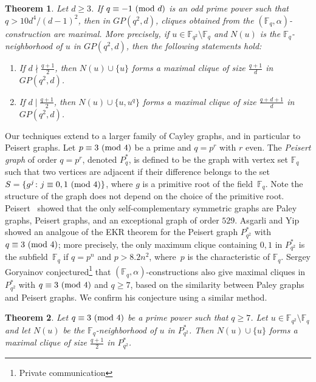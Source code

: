 \documentclass[12pt,reqno]{amsart}
\newtheorem{thm}{Theorem}[section]
\theoremstyle{definition}
\newcommand{\F}{\mathbb{F}}
\renewcommand{\pmod}[1]{{\ifmmode\text{\rm\ (mod~$#1$)}\else\discretionary{}{}{\hbox{ }}\rm(mod~$#1$)\fi}}
\begin{document}
\begin{thm}\label{thm:GP}
Let $d \geq 3$. If $q \equiv -1 \pmod d$ is an odd prime power such that  $q>10d^4/(d-1)^2$, then in $GP(q^2,d)$, cliques obtained from the $(\F_q, \alpha)$-construction are maximal. More precisely, if $u \in \F_{q^2}\setminus \F_q$ and $N(u)$ is the $\F_q$-neighborhood of $u$ in $GP(q^2,d)$, then the following statements hold: 
\begin{enumerate}
    \item[(a)] If $d \nmid \frac{q+1}{2}$, then $N(u) \cup \{u\}$ forms a maximal clique of size $\frac{q+1}{d}$ in $GP(q^2,d)$.
    \item[(b)] If $d \mid \frac{q+1}{2}$, then $N(u) \cup \{u,u^q\}$ forms a maximal clique of size $\frac{q+d+1}{d}$ in $GP(q^2,d)$.
\end{enumerate}    
\end{thm}

Our techniques extend to a larger family of Cayley graphs, and in particular to Peisert graphs. Let $p \equiv 3 \pmod 4$ be a prime and $q=p^r$ with $r$ even. The {\em Peisert graph} of order $q=p^r$, denoted $P^*_q$, is defined to be the graph with vertex set $\F_{q}$ such that two vertices are adjacent if their difference belongs to the set $S=\{g^j\colon j \equiv 0,1 \pmod 4\}$, where $g$ is a primitive root of the field~$\F_q$. Note the structure of the graph does not depend on the choice of the primitive root. Peisert~\cite{P01} showed that the only self-complementary symmetric graphs are Paley graphs, Peisert graphs, and an exceptional graph of order $529$. Asgarli and Yip \cite[Theorem 1.4]{AY22} showed an analgoue of the EKR theorem for the Peisert graph $P_{q^2}^*$ with $q \equiv 3 \pmod 4$; more precisely, the only maximum clique containing $0,1$ in $P_{q^2}^*$ is the subfield~$\F_q$ if $q=p^n$ and $p>8.2n^2$, where~$p$ is the characteristic of $\F_q$. Sergey Goryainov conjectured\footnote{Private communication} that $(\F_q, \alpha)$-constructions also give maximal cliques in $P_{q^2}^*$ with $q \equiv 3 \pmod 4$ and $q \geq 7$, based on the similarity between Paley graphs and Peisert graphs. We confirm his conjecture using a similar method.

\begin{thm}\label{thm:P*}
Let $q\equiv 3 \pmod 4$ be a prime power such that $q \geq 7$. Let $u \in \F_{q^2}\setminus \F_q$ and let $N(u)$ be the $\F_q$-neighborhood of $u$ in $P_{q^2}^*$. Then $N(u) \cup \{u\}$ forms a maximal clique of size $\frac{q+1}{2}$ in $P_{q^2}^*$.
\end{thm}
\end{document}
